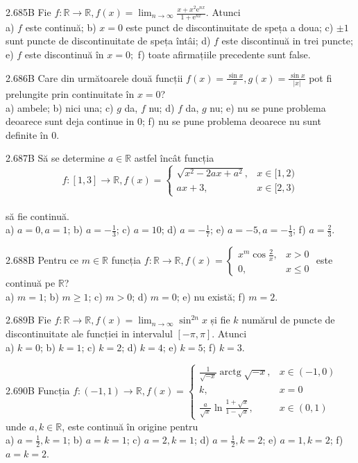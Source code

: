 \documentclass[11pt]{article}
\begin{document}
2.685B Fie $f: \mathbb{R} \rightarrow \mathbb{R}, f(x)=\lim _{n \rightarrow \infty} \frac{x+x^{2} \mathrm{e}^{n x}}{1+\mathrm{e}^{n x}}$. Atunci\\ a) $f$ este continuă; b) $x=0$ este punct de discontinuitate de speța a doua; c) $\pm 1$ sunt puncte de discontinuitate de speța întâi; d) $f$ este discontinuă in trei puncte; e) $f$ este discontinuă în $x=0 ;$ f) toate afirmațiile precedente sunt false.

2.686B Care din următoarele două funcții $f(x)=\frac{\sin x}{x}, g(x)=\frac{\sin x}{|x|}$ pot fi prelungite prin continuitate în $x=0$?\\ a) ambele; b) nici una; c) $g$ da, $f$ nu; d) $f$ da, $g$ nu; e) nu se pune problema deoarece sunt deja continue in $0$; f) nu se pune problema deoarece nu sunt definite în $0$.

2.687B Să se determine $a \in \mathbb{R}$ astfel încât funcția $$f:[1,3] \rightarrow \mathbb{R}, f(x)= \begin{cases}\sqrt{x^{2}-2 a x+a^{2}}, & x \in[1,2) \\ a x+3, & x \in[2,3)\end{cases}$$\\să fie continuă.\\ a) $a=0, a=1$; b) $a=-\frac{1}{3}$; c) $a=10$; d) $a=-\frac{1}{7}$; e) $a=-5, a=-\frac{1}{3}$; f) $a=\frac{2}{3}$.

2.688B Pentru ce $m \in \mathbb{R}$ funcția $f: \mathbb{R} \rightarrow \mathbb{R}, f(x)= \begin{cases}x^{m} \cos \frac{2}{x}, & x>0 \\ 0, & x \leq 0\end{cases}$ este continuă pe $\mathbb{R}$?\\ a) $m=1$; b) $m \geq 1$; c) $m>0$; d) $m=0$; e) nu există; f) $m=2$.

2.689B Fie $f: \mathbb{R} \rightarrow \mathbb{R}, f(x)=\lim _{n \rightarrow \infty} \sin ^{2 n} x$ și fie $k$ numărul de puncte de discontinuitate ale funcției in intervalul $[-\pi, \pi]$. Atunci\\ a) $k=0$; b) $k=1$; c) $k=2$; d) $k=4$; e) $k=5$; f) $k=3$.

2.690B Funcția $f:(-1,1) \rightarrow \mathbb{R}, f(x)= \begin{cases}\frac{1}{\sqrt{-x}} \operatorname{arctg} \sqrt{-x}, & x \in(-1,0) \\ k, & x=0 \\ \frac{a}{\sqrt{x}} \ln \frac{1+\sqrt{x}}{1-\sqrt{x}}, & x \in(0,1)\end{cases}$\\ unde $a, k \in \mathbb{R}$, este continuă în origine pentru\\ a) $a=\frac{1}{2}, k=1$; b) $a=k=1$; c) $a=2, k=1$; d) $a=\frac{1}{2}, k=2$; e) $a=1, k=2$; f) $a=k=2$.
\end{document}
